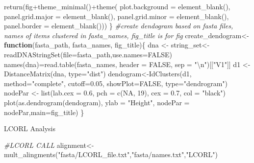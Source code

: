 \documentclass[
]{article}
\newenvironment{Shaded}{\begin{snugshade}}{\end{snugshade}}
\newcommand{\AttributeTok}[1]{\textcolor[rgb]{0.77,0.63,0.00}{#1}}
\newcommand{\CommentTok}[1]{\textcolor[rgb]{0.56,0.35,0.01}{\textit{#1}}}
\newcommand{\ConstantTok}[1]{\textcolor[rgb]{0.00,0.00,0.00}{#1}}
\newcommand{\ControlFlowTok}[1]{\textcolor[rgb]{0.13,0.29,0.53}{\textbf{#1}}}
\newcommand{\DecValTok}[1]{\textcolor[rgb]{0.00,0.00,0.81}{#1}}
\newcommand{\FloatTok}[1]{\textcolor[rgb]{0.00,0.00,0.81}{#1}}
\newcommand{\FunctionTok}[1]{\textcolor[rgb]{0.00,0.00,0.00}{#1}}
\newcommand{\NormalTok}[1]{#1}
\newcommand{\OtherTok}[1]{\textcolor[rgb]{0.56,0.35,0.01}{#1}}
\newcommand{\SpecialCharTok}[1]{\textcolor[rgb]{0.00,0.00,0.00}{#1}}
\newcommand{\StringTok}[1]{\textcolor[rgb]{0.31,0.60,0.02}{#1}}
\begin{document}
\begin{Shaded}
\begin{Highlighting}[]
  \FunctionTok{return}\NormalTok{(fig}\SpecialCharTok{+}\FunctionTok{theme\_minimal}\NormalTok{()}\SpecialCharTok{+}\FunctionTok{theme}\NormalTok{(}
    \AttributeTok{plot.background =} \FunctionTok{element\_blank}\NormalTok{(),}
    \AttributeTok{panel.grid.major =} \FunctionTok{element\_blank}\NormalTok{(),}
    \AttributeTok{panel.grid.minor =} \FunctionTok{element\_blank}\NormalTok{(),}
    \AttributeTok{panel.border =} \FunctionTok{element\_blank}\NormalTok{()))}
\NormalTok{\}}
\CommentTok{\#create dendogram based on fasta files, names of items clustered in fasta\_names, fig\_title is for fig}
\NormalTok{create\_dendogram}\OtherTok{\textless{}{-}}\ControlFlowTok{function}\NormalTok{(fasta\_path, fasta\_names, fig\_title)\{}
\NormalTok{  dna }\OtherTok{\textless{}{-}}\NormalTok{ string\_set}\OtherTok{\textless{}{-}}\FunctionTok{readDNAStringSet}\NormalTok{(}\AttributeTok{file=}\NormalTok{fasta\_path,}\AttributeTok{use.names=}\ConstantTok{FALSE}\NormalTok{)}
  \FunctionTok{names}\NormalTok{(dna)}\OtherTok{=}\FunctionTok{read.table}\NormalTok{(fasta\_names, }\AttributeTok{header =} \ConstantTok{FALSE}\NormalTok{, }\AttributeTok{sep =} \StringTok{"}\SpecialCharTok{\textbackslash{}n}\StringTok{"}\NormalTok{)[[}\StringTok{"V1"}\NormalTok{]]}
\NormalTok{  d1 }\OtherTok{\textless{}{-}} \FunctionTok{DistanceMatrix}\NormalTok{(dna, }\AttributeTok{type=}\StringTok{"dist"}\NormalTok{)}
\NormalTok{  dendogram}\OtherTok{\textless{}{-}}\FunctionTok{IdClusters}\NormalTok{(d1, }\AttributeTok{method=}\StringTok{"complete"}\NormalTok{, }\AttributeTok{cutoff=}\FloatTok{0.05}\NormalTok{, }\AttributeTok{showPlot=}\ConstantTok{FALSE}\NormalTok{,}
                        \AttributeTok{type=}\StringTok{"dendrogram"}\NormalTok{)}
\NormalTok{  nodePar }\OtherTok{\textless{}{-}} \FunctionTok{list}\NormalTok{(}\AttributeTok{lab.cex =} \FloatTok{0.6}\NormalTok{, }\AttributeTok{pch =} \FunctionTok{c}\NormalTok{(}\ConstantTok{NA}\NormalTok{, }\DecValTok{19}\NormalTok{), }
                \AttributeTok{cex =} \FloatTok{0.7}\NormalTok{, }\AttributeTok{col =} \StringTok{"black"}\NormalTok{)}
  \FunctionTok{plot}\NormalTok{(}\FunctionTok{as.dendrogram}\NormalTok{(dendogram), }\AttributeTok{ylab =} \StringTok{"Height"}\NormalTok{, }\AttributeTok{nodePar =}
\NormalTok{         nodePar,}\AttributeTok{main=}\NormalTok{fig\_title)}
\NormalTok{\}}
\end{Highlighting}
\end{Shaded}

LCORL Analysis

\begin{Shaded}
\begin{Highlighting}[]
\CommentTok{\#LCORL CALL}
\NormalTok{alignment}\OtherTok{\textless{}{-}}\FunctionTok{mult\_alingments}\NormalTok{(}\StringTok{"fasta/LCORL\_file.txt"}\NormalTok{,}\StringTok{"fasta/names.txt"}\NormalTok{,}\StringTok{"LCORL"}\NormalTok{)}
\end{Highlighting}
\end{Shaded}
\end{document}
